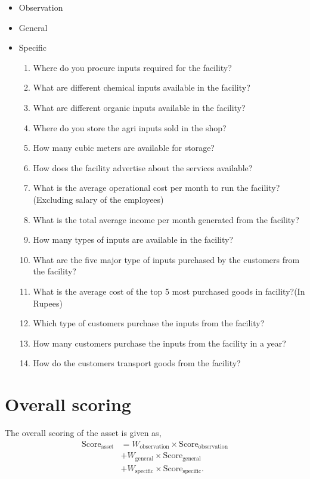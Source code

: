 \documentclass[oneside,twocolumn]{article}
\newcommand{\tsub}[2]{\text{#1}_{\text{#2}}}
\newcommand{\tsubb}[2]{#1_{\text{#2}}}
\begin{document}
               \begin{itemize}
               \item Observation
               \item General
               \item Specific
                 \begin{enumerate}
                 \item Where do you procure inputs required for the facility?
                 \item What are different chemical inputs available in the facility?
                 \item What are different organic inputs available in the facility?
                 \item Where do you store the agri inputs sold in the shop?
                 \item How many cubic meters are available for storage?
                 \item How does the facility advertise about the services available?
                 \item What is the average operational cost per month to run
                   the facility? (Excluding salary of the employees)
                 \item What is the total average income per month generated from the facility?
                 \item How many types of inputs are available in the
                   facility?
                 \item What are the five major type of inputs purchased
                   by the customers from the facility?
                 \item What is the average cost of the top 5 most purchased goods in facility?(In Rupees)
                 \item Which type of customers purchase the inputs from
                   the facility?
                 \item How many customers purchase the inputs from the facility in a year?
                 \item How do the customers transport goods from the facility?
                 \end{enumerate}
               \end{itemize}

               \section{Overall scoring}
               The overall scoring of the asset is given  as,
               \begin{align*}
                 \tsub{Score}{asset} &= \tsubb{W}{observation} \times \tsub{Score}{observation} \\
                 &+ \tsubb{W}{general} \times \tsub{Score}{general} \\
                 &+ \tsubb{W}{specific} \times \tsub{Score}{specific}.
               \end{align*}
               
\end{document}
